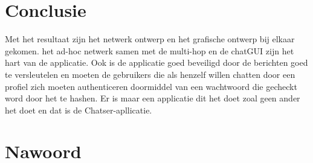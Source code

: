 \documentclass[12pt]{article}
\begin{document}
\section{Conclusie}
Met het resultaat zijn het netwerk ontwerp en het grafische ontwerp bij elkaar gekomen.  het ad-hoc netwerk samen met de multi-hop en de chatGUI zijn het hart van de applicatie.  Ook is de applicatie goed beveiligd door de berichten goed te versleutelen en moeten de gebruikers die als henzelf willen chatten door een profiel zich moeten authenticeren doormiddel van een wachtwoord die gecheckt word door het te hashen. Er is maar een applicatie dit het doet zoal geen ander het doet en dat is de Chatser-apllicatie\small\textcopyright.

\newpage

\section{Nawoord}

\newpage



\end{document}
